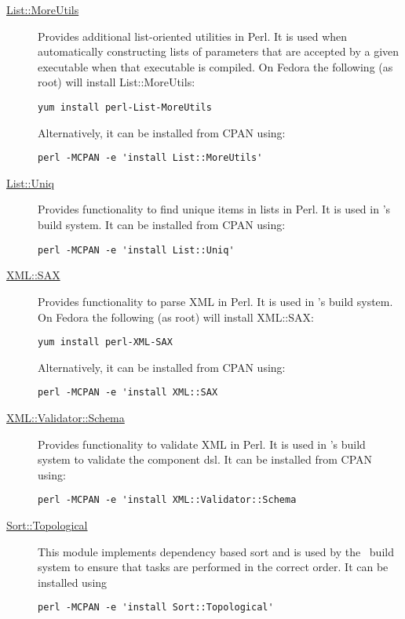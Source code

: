 \begin{description}
\item [\href{http://search.cpan.org/~adamk/List-MoreUtils-0.33/lib/List/MoreUtils.pm}{{\normalfont \ttfamily List::MoreUtils}}] Provides additional list-oriented utilities in Perl. It is used when automatically constructing lists of parameters that are accepted by a given executable when that executable is compiled. On Fedora the following (as root) will install {\normalfont \ttfamily List::MoreUtils}:
\begin{verbatim}
yum install perl-List-MoreUtils
\end{verbatim}
Alternatively, it can be installed from CPAN using:
\begin{verbatim}
perl -MCPAN -e 'install List::MoreUtils'
\end{verbatim}

\item [\href{http://search.cpan.org/~jfitz/List-Uniq-0.20/lib/List/Uniq.pm}{{\normalfont \ttfamily List::Uniq}}] Provides functionality to find unique items in lists in Perl. It is used in \glc's build system. It can be installed from CPAN using:
\begin{verbatim}
perl -MCPAN -e 'install List::Uniq'
\end{verbatim}

\item [\href{http://search.cpan.org/~grantm/XML-SAX-0.99/SAX.pm}{{\normalfont \ttfamily XML::SAX}}] Provides functionality to parse XML in Perl. It is used in \glc's build system. On Fedora the following (as root) will install {\normalfont \ttfamily XML::SAX}:
\begin{verbatim}
yum install perl-XML-SAX
\end{verbatim}
Alternatively, it can be installed from CPAN using:
\begin{verbatim}
perl -MCPAN -e 'install XML::SAX
\end{verbatim}

\item [\href{http://search.cpan.org/~samtregar/XML-Validator-Schema-1.08/Schema.pm}{{\normalfont \ttfamily XML::Validator::Schema}}] Provides functionality to validate XML in Perl. It is used in \glc's build system to validate the \gls{component} \gls{dsl}. It can be installed from CPAN using:
\begin{verbatim}
perl -MCPAN -e 'install XML::Validator::Schema
\end{verbatim}

\item [\href{http://search.cpan.org/~kstephens/Data-Match-0.06/lib/Sort/Topological.pm}{{\normalfont \ttfamily Sort::Topological }}] This module implements dependency based sort and is used by the \glc\ build system to ensure that tasks are performed in the correct order. It can be installed using
\begin{verbatim}
perl -MCPAN -e 'install Sort::Topological'
\end{verbatim}


\end{description}
